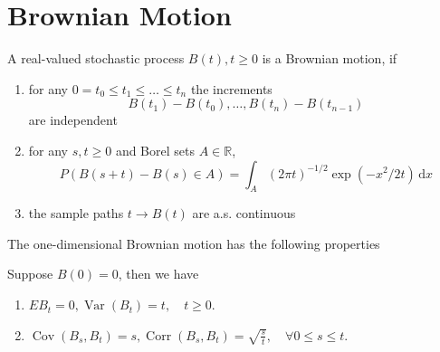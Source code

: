 \chapter{Brownian Motion}

\begin{definition}
    A real-valued stochastic process $B(t),t\geq 0$ is a Brownian motion, if
    \begin{enumerate}
        \item for any $0=t_{0}\leq t_{1}\leq\ldots\leq t_{n}$ the increments
              \begin{equation*}
                  B\left(t_{1}\right)-B\left(t_{0}\right),\ldots,B\left(t_{n}\right)-B\left(t_{n-1}\right)
              \end{equation*}
              are independent
        \item for any $s,t\geq 0$ and Borel sets $A\in\mathbb{R}$,
              \begin{equation}
                  P\left(B(s+t)-B(s)\in A\right)=\int_{A}(2\pi t)^{-1/2}\exp\left(-x^{2}/2t\right)\,\mathrm{d}x
              \end{equation}
        \item the sample paths $t\rightarrow B(t)$ are a.s. continuous
    \end{enumerate}
\end{definition}

The one-dimensional Brownian motion has the following properties

\begin{property}
    Suppose $B(0)=0$, then we have
    \begin{enumerate}
        \item $EB_{t}=0,\operatorname{Var}\left(B_{t}\right)=t,\quad t\geq 0$.
        \item $\operatorname{Cov}\left(B_{s},B_{t}\right)=s,\operatorname{Corr}\left(B_{s},B_{t}\right)=\sqrt{\frac{s}{t}},\quad\forall 0\leq s\leq t$.
    \end{enumerate}
\end{property}

